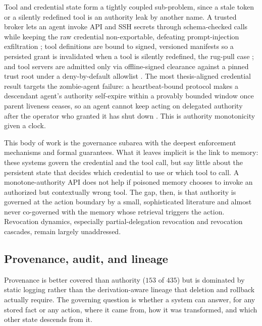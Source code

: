 Tool and credential state form a tightly coupled sub-problem, since a stale token or a silently redefined tool is an authority leak by another name. A trusted broker lets an agent invoke API and SSH secrets through schema-checked calls while keeping the raw credential non-exportable, defeating prompt-injection exfiltration \citep{jin2026capseal}; tool definitions are bound to signed, versioned manifests so a persisted grant is invalidated when a tool is silently redefined, the rug-pull case \citep{bhatt2025etdi}; and tool servers are admitted only via offline-signed clearance against a pinned trust root under a deny-by-default allowlist \citep{metere2026attestedtoolserver}. The most thesis-aligned credential result targets the zombie-agent failure: a heartbeat-bound protocol makes a descendant agent's authority self-expire within a provably bounded window once parent liveness ceases, so an agent cannot keep acting on delegated authority after the operator who granted it has shut down \citep{deochake2026heartbeatcred}. This is authority monotonicity given a clock.

This body of work is the governance subarea with the deepest enforcement mechanisms and formal guarantees. What it leaves implicit is the link to memory: these systems govern the credential and the tool call, but say little about the persistent state that decides which credential to use or which tool to call. A monotone-authority API does not help if poisoned memory chooses to invoke an authorized but contextually wrong tool. The gap, then, is that authority is governed at the action boundary by a small, sophisticated literature and almost never co-governed with the memory whose retrieval triggers the action. Revocation dynamics, especially partial-delegation revocation and revocation cascades, remain largely unaddressed.

\subsection{Provenance, audit, and lineage}

Provenance is better covered than authority ($153$ of $435$) but is dominated by static logging rather than the derivation-aware lineage that deletion and rollback actually require. The governing question is whether a system can answer, for any stored fact or any action, where it came from, how it was transformed, and which other state descends from it.

